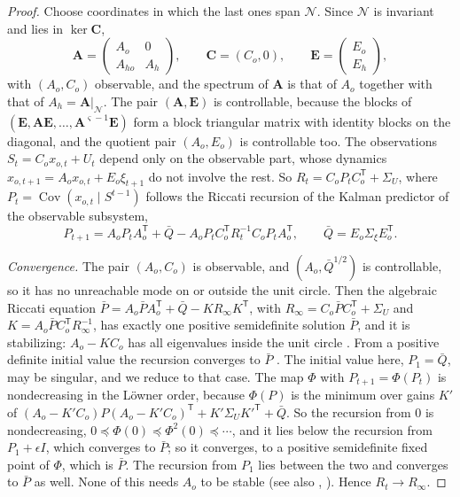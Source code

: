 \documentclass[11pt,onecolumn]{IEEEtran}
\newcommand{\E}{\mathbb{E}}
\newcommand{\Cov}{\operatorname{Cov}}
\newcommand{\bA}{\mathbf A}
\newcommand{\bC}{\mathbf C}
\newcommand{\bE}{\mathbf E}
\begin{document}
\begin{proof}
Choose coordinates in which the last ones span $\mathcal N$. Since
$\mathcal N$ is invariant and lies in $\ker\bC$,
\[
\bA=\begin{pmatrix}A_o&0\\A_{ho}&A_h\end{pmatrix},\qquad
\bC=(C_o,0),\qquad\bE=\begin{pmatrix}E_o\\E_h\end{pmatrix},
\]
with $(A_o,C_o)$ observable, and the spectrum of $\bA$ is that of $A_o$
together with that of $A_h=\bA|_{\mathcal N}$. The pair $(\bA,\bE)$ is
controllable, because the blocks of
$(\bE,\bA\bE,\dots,\bA^{\varsigma-1}\bE)$ form a block triangular matrix
with identity blocks on the diagonal, and the quotient pair
$(A_o,E_o)$ is controllable too. The observations
$S_t=C_ox_{o,t}+U_t$ depend only on the observable part, whose
dynamics $x_{o,t+1}=A_ox_{o,t}+E_o\xi_{t+1}$ do not involve the rest. So
$R_t=C_oP_tC_o^{\mathsf T}+\Sigma_U$, where $P_t=\Cov(x_{o,t}\mid S^{t-1})$
follows the Riccati recursion of the Kalman predictor of the observable
subsystem,
\[
P_{t+1}=A_oP_tA_o^{\mathsf T}+\bar Q-A_oP_tC_o^{\mathsf T}R_t^{-1}C_oP_tA_o^{\mathsf T},\qquad
\bar Q=E_o\Sigma_\xi E_o^{\mathsf T}.
\]

\emph{Convergence.} The pair $(A_o,C_o)$ is observable, and
$(A_o,\bar Q^{1/2})$ is controllable, so it has no unreachable mode on or
outside the unit circle. Then the algebraic Riccati equation
$\bar P=A_o\bar PA_o^{\mathsf T}+\bar Q-KR_\infty K^{\mathsf T}$, with
$R_\infty=C_o\bar PC_o^{\mathsf T}+\Sigma_U$ and
$K=A_o\bar PC_o^{\mathsf T}R_\infty^{-1}$, has exactly one positive
semidefinite solution $\bar P$, and it is stabilizing: $A_o-KC_o$ has all
eigenvalues inside the unit circle \cite[Theorem~3.2(B),(C)]{desouza1986}.
From a positive definite initial value the recursion converges to
$\bar P$ \cite[Theorem~4.1]{desouza1986}. The initial value here,
$P_1=\bar Q$, may be singular, and we reduce to that case. The map $\Phi$
with $P_{t+1}=\Phi(P_t)$ is nondecreasing in the L\"owner order, because
$\Phi(P)$ is the minimum over gains $K'$ of
$(A_o-K'C_o)P(A_o-K'C_o)^{\mathsf T}+K'\Sigma_UK'^{\mathsf T}+\bar Q$. So the
recursion from $0$ is nondecreasing, $0\preceq\Phi(0)\preceq\Phi^2(0)\preceq\cdots$,
and it lies below the recursion from $P_1+\epsilon I$, which converges to
$\bar P$; so it converges, to a positive semidefinite fixed point of
$\Phi$, which is $\bar P$. The recursion from $P_1$ lies between the two
and converges to $\bar P$ as well. None of this needs $A_o$ to be stable
(see also \cite[Ch.~4]{andersonmoore1979}, \cite{kailath2000}). Hence
$R_t\to R_\infty$.


\end{proof}
\end{document}
